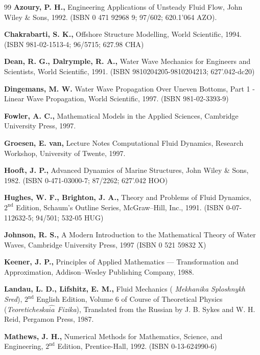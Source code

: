 \documentclass[12pt,a4paper]{report}
\begin{document}
\begin{thebibliography}{99}
  \textbf{Azoury, P. H.,} Engineering Applications of Unsteady
Fluid Flow, John Wiley \& Sons, 1992. (ISBN 0 471 92968 9; 97/602; 620.1'064
AZO). 

  \textbf{Chakrabarti, S. K.,} Offshore Structure Modelling,
World Scientific, 1994. (ISBN 981-02-1513-4; 96/5715; 627.98 CHA)

  \textbf{Dean, R. G., Dalrymple, R. A.,} Water Wave Mechanics
for Engineers and Scientists, World Scientific, 1991. (ISBN
9810204205-9810204213; 627'.042-dc20)

  \textbf{Dingemans, M. W.} Water Wave Propagation Over Uneven
Bottoms, Part 1 - Linear Wave Propagation, World Scientific, 1997. (ISBN
981-02-3393-9)

  \textbf{Fowler, A. C., } Mathematical Models in the Applied
Sciences, Cambridge University Press, 1997.

  \textbf{Groesen, E. van,} Lecture Notes Computational Fluid
Dynamics, Research Workshop, University of Twente, 1997.

  \textbf{Hooft, J. P.,} Advanced Dynamics of Marine
Structures, John Wiley \& Sons, 1982. (ISBN 0-471-03000-7; 87/2262; 627'.042
HOO)

  \textbf{Hughes, W. F., Brighton, J. A.,} Theory and Problems
of Fluid Dynamics, $2^\text{nd}$ Edition, Schaum's Outline Series, McGraw--Hill,
Inc., 1991. (ISBN 0-07-112632-5; 94/501; 532-05 HUG)

  \textbf{Johnson, R. S.,} A Modern Introduction to the
Mathematical Theory of Water Waves, Cambridge University Press, 1997 (ISBN 0
521 59832 X)

  \textbf{Keener, J. P.,} Principles of Applied Mathematics ---
Transformation and Approximation, Addison--Wesley Publishing Company, 1988.

  \textbf{Landau, L. D., Lifshitz, E. M.,} Fluid Mechanics (%
\textit{Mekhanika Sploshnykh Sred}), $2^\text{nd}$ English Edition, Volume 6 of
Course of Theoretical Physics (\textit{Teoreticheska$\widehat{ia}$ Fizika}),
Translated from the Russian by J. B. Sykes and W. H. Reid, Pergamon Press,
1987.

  \textbf{Mathews, J. H.,} Numerical Methods for Mathematics,
Science, and Engineering, $2^\text{nd}$ Edition, Prentice-Hall, 1992. (ISBN
0-13-624990-6)


\end{thebibliography}
\end{document}
